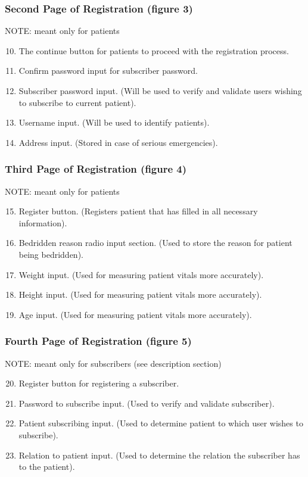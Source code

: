 \subsubsection{Second Page of Registration (figure 3)}
NOTE: meant only for patients
\begin{enumerate}
\setcounter{enumi}{9}
	\item The continue button for patients to proceed with the registration process. 
	\item Confirm password input for subscriber password. 
	\item Subscriber password input. (Will be used to verify and validate users wishing to subscribe to current patient). 
	\item Username input. (Will be used to identify patients). 
	\item Address input. (Stored in case of serious emergencies). 
\end{enumerate}
\subsubsection{Third Page of Registration (figure 4)}
NOTE: meant only for patients
\begin{enumerate}
\setcounter{enumi}{14}
	\item Register button. (Registers patient that has filled in all necessary information). 
	\item Bedridden reason radio input section. (Used to store the reason for patient being bedridden). 
	\item Weight input. (Used for measuring patient vitals more accurately). 
	\item Height input. (Used for measuring patient vitals more accurately). 
	\item Age input. (Used for measuring patient vitals more accurately). 
\end{enumerate}
\subsubsection{Fourth Page of Registration (figure 5)}
NOTE: meant only for subscribers (see description section)
\begin{enumerate}
\setcounter{enumi}{19}
	\item Register button for registering a subscriber. 
	\item Password to subscribe input. (Used to verify and validate subscriber). 
	\item Patient subscribing input. (Used to determine patient to which user wishes to subscribe). 
	\item Relation to patient input. (Used to determine the relation the subscriber has to the patient). 
\end{enumerate}
